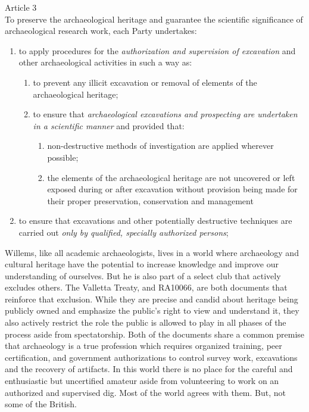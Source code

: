 \documentclass[english]{ijsra}
\begin{document}
\begin{displayquote}
	Article 3\\
	To preserve the archaeological heritage and guarantee the scientific significance of archaeological research work, each Party undertakes:
	\begin{enumerate}
		\item to apply procedures for the \textit{authorization and supervision of excavation} and other archaeological activities in such a way as:  
		\begin{enumerate}
			\item to prevent any illicit excavation or removal of elements of the archaeological heritage; 
			\item to ensure that \textit{archaeological excavations and prospecting are undertaken in a scientific manner} and provided that:
			\begin{enumerate}
				\item non-destructive methods of investigation are applied wherever possible;
				\item the elements of the archaeological heritage are not uncovered or left exposed during or after excavation without provision being made for their proper preservation, conservation and management
			\end{enumerate}
		\end{enumerate}
		\item to ensure that excavations and other potentially destructive techniques are carried out \textit{only by qualified, specially authorized persons}; \parencite{CIA_2001}
	\end{enumerate}
\end{displayquote}


Willems, like all academic archaeologists, lives in a world where archaeology and cultural heritage have the potential to increase knowledge and improve our understanding of ourselves. But he is also part of a select club that actively excludes others. The Valletta Treaty, and RA10066, are both documents that reinforce that exclusion. While they are precise and candid about heritage being publicly owned and emphasize the public’s right to view and understand it, they also actively restrict the role the public is allowed to play in all phases of the process aside from spectatorship.  Both of the documents share a common premise that archaeology is a true profession which requires organized training, peer certification, and government authorizations to control survey work, excavations and the recovery of artifacts. In this world there is no place for the careful and enthusiastic but uncertified amateur aside from volunteering to work on an authorized and supervised dig. Most of the world agrees with them. But, not some of the British.
\end{document}
